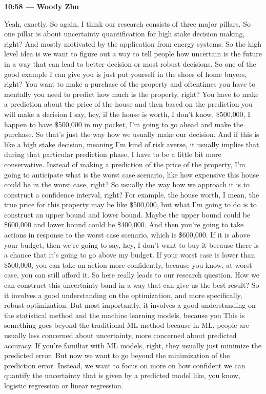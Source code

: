 \documentclass[11pt]{article}
\newcommand{\Turn}[2]{%
  \medskip\noindent\textbf{#1 --- #2}\par\nobreak\noindent\ignorespaces
}
\begin{document}
\Turn{10:58}{Woody Zhu}
Yeah, exactly. So again, I think our research consists of three major pillars.
So one pillar is about uncertainty quantification for high stake decision
making, right? And mostly motivated by the application from energy systems. So
the high level idea is we want to figure out a way to tell people how uncertain
is the future in a way that can lead to better decision or most robust
decisions. So one of the good example I can give you is just put yourself in
the shoes of home buyers, right? You want to make a purchase of the property
and oftentimes you have to mentally you need to predict how much is the
property, right? You have to make a prediction about the price of the house and
then based on the prediction you will make a decision I say, hey, if the house
is worth, I don't know, \$500{,}000, I happen to have \$500{,}000 in my pocket,
I'm going to go ahead and make the purchase. So that's just the way how we
usually make our decision. And if this is like a high stake decision, meaning
I'm kind of risk averse, it usually implies that during that particular
prediction phase, I have to be a little bit more conservative. Instead of
making a prediction of the price of the property, I'm going to anticipate what
is the worst case scenario, like how expensive this house could be in the worst
case, right? So usually the way how we approach it is to construct a confidence
interval, right? For example, the house worth, I mean, the true price for this
property may be like \$500{,}000, but what I'm going to do is to construct an
upper bound and lower bound. Maybe the upper bound could be \$600{,}000 and
lower bound could be \$400{,}000. And then you're going to take actions in
response to the worst case scenario, which is \$600{,}000. If it is above your
budget, then we're going to say, hey, I don't want to buy it because there is a
chance that it's going to go above my budget. If your worst case is lower than
\$500{,}000, you can take an action more confidently, because you know, at
worst case, you can still afford it. So here really leads to our research
question. How we can construct this uncertainty band in a way that can give us
the best result? So it involves a good understanding on the optimization, and
more specifically, robust optimization. But most importantly, it involves a
good understanding on the statistical method and the machine learning models,
because you This is something goes beyond the traditional ML method because in
ML, people are usually less concerned about uncertainty, more concerned about
predicted accuracy. If you're familiar with ML models, right, they usually just
minimize the predicted error. But now we want to go beyond the minimization of
the prediction error. Instead, we want to focus on more on how confident we can
quantify the uncertainty that is given by a predicted model like, you know,
logistic regression or linear regression.
\end{document}
